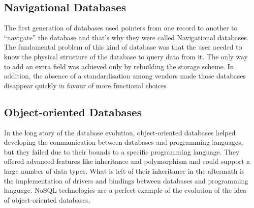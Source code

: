 \subsection{Navigational Databases}
The first generation of databases used pointers from one record to another to “navigate” the database and that’s why they were called Navigational databases.
The fundamental problem of this kind of database was that the user needed to know the physical structure of the database to query data from it. The only way to add an extra field was achieved only by rebuilding the storage scheme.
In addition, the absence of a standardisation among vendors made those databases disappear quickly in favour of more functional choices

\subsection{Object-oriented Databases}
In the long story of the database evolution, object-oriented databases helped developing the communication between databases and programming languages, but they failed due to their bounds to a specific programming language. They offered advanced features like inheritance and polymorphism and could support a large number of data types.
What is left of their inheritance in the aftermath is the implementation of drivers and bindings between databases and programming language.
NoSQL technologies are a perfect example of the evolution of the idea of object-oriented databases.

